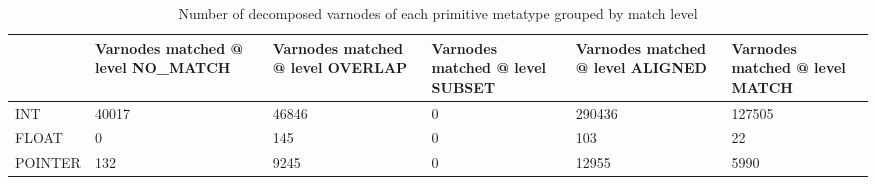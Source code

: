\begin{table}[t]
\centering
\caption{Number of decomposed varnodes of each primitive metatype grouped by match level}
\label{table:metatype-match-levels-decomposed}
\begin{tabular}{lp{3.6cm}p{3.6cm}p{3.6cm}p{3.6cm}p{3.6cm}}
\toprule
{} &  Varnodes matched @ level NO\_MATCH &  Varnodes matched @ level OVERLAP &  Varnodes matched @ level SUBSET &  Varnodes matched @ level ALIGNED &  Varnodes matched @ level MATCH \\
\midrule
INT     &                              40017 &                             46846 &                                0 &                            290436 &                          127505 \\
FLOAT   &                                  0 &                               145 &                                0 &                               103 &                              22 \\
POINTER &                                132 &                              9245 &                                0 &                             12955 &                            5990 \\
\bottomrule
\end{tabular}
\end{table}
